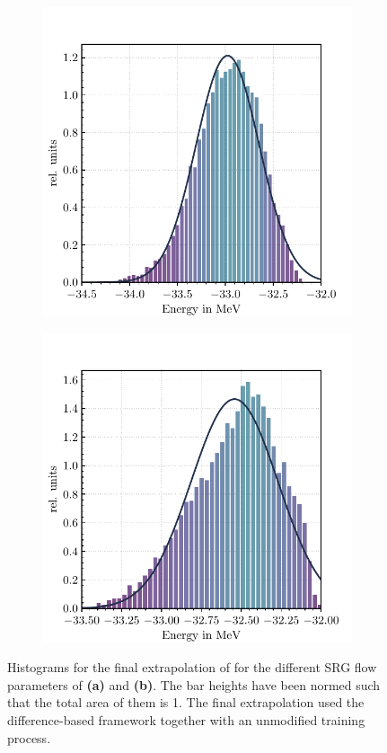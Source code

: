 \begin{figure}[H]
  \begin{subfigure}{.5\textwidth}
    \includegraphics[width=\textwidth]{media/li6_0400_histogram.pdf}
    \caption{}
  \end{subfigure}
  \begin{subfigure}{.5\textwidth}
    \includegraphics[width=\textwidth]{media/li6_0800_histogram.pdf}
    \caption{}
  \end{subfigure}
  \caption{Histograms for the final extrapolation of  for the different SRG flow parameters of  \textbf{(a)} and  \textbf{(b)}. The bar heights have been normed such that the total area of them is 1. The final extrapolation used the difference-based framework together with an unmodified training process.}
  \label{fig:hists_li6}
\end{figure}
